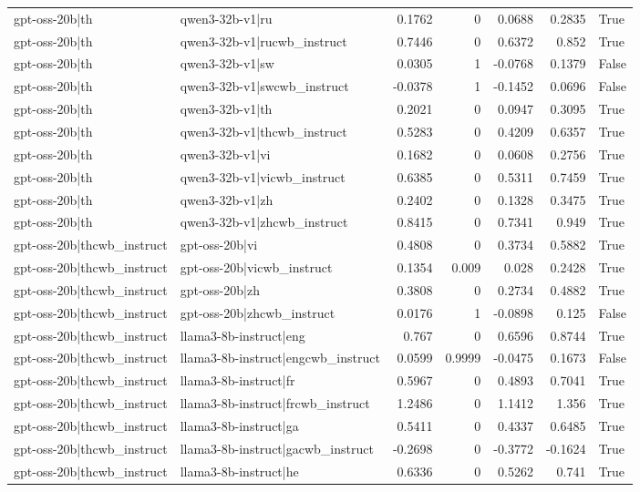 \begin{table}
\begin{tabular}{l l r r r r l}
gpt-oss-20b|th & qwen3-32b-v1|ru & 0.1762 & 0 & 0.0688 & 0.2835 & True \\
gpt-oss-20b|th & qwen3-32b-v1|rucwb_instruct & 0.7446 & 0 & 0.6372 & 0.852 & True \\
gpt-oss-20b|th & qwen3-32b-v1|sw & 0.0305 & 1 & -0.0768 & 0.1379 & False \\
gpt-oss-20b|th & qwen3-32b-v1|swcwb_instruct & -0.0378 & 1 & -0.1452 & 0.0696 & False \\
gpt-oss-20b|th & qwen3-32b-v1|th & 0.2021 & 0 & 0.0947 & 0.3095 & True \\
gpt-oss-20b|th & qwen3-32b-v1|thcwb_instruct & 0.5283 & 0 & 0.4209 & 0.6357 & True \\
gpt-oss-20b|th & qwen3-32b-v1|vi & 0.1682 & 0 & 0.0608 & 0.2756 & True \\
gpt-oss-20b|th & qwen3-32b-v1|vicwb_instruct & 0.6385 & 0 & 0.5311 & 0.7459 & True \\
gpt-oss-20b|th & qwen3-32b-v1|zh & 0.2402 & 0 & 0.1328 & 0.3475 & True \\
gpt-oss-20b|th & qwen3-32b-v1|zhcwb_instruct & 0.8415 & 0 & 0.7341 & 0.949 & True \\
gpt-oss-20b|thcwb_instruct & gpt-oss-20b|vi & 0.4808 & 0 & 0.3734 & 0.5882 & True \\
gpt-oss-20b|thcwb_instruct & gpt-oss-20b|vicwb_instruct & 0.1354 & 0.009 & 0.028 & 0.2428 & True \\
gpt-oss-20b|thcwb_instruct & gpt-oss-20b|zh & 0.3808 & 0 & 0.2734 & 0.4882 & True \\
gpt-oss-20b|thcwb_instruct & gpt-oss-20b|zhcwb_instruct & 0.0176 & 1 & -0.0898 & 0.125 & False \\
gpt-oss-20b|thcwb_instruct & llama3-8b-instruct|eng & 0.767 & 0 & 0.6596 & 0.8744 & True \\
gpt-oss-20b|thcwb_instruct & llama3-8b-instruct|engcwb_instruct & 0.0599 & 0.9999 & -0.0475 & 0.1673 & False \\
gpt-oss-20b|thcwb_instruct & llama3-8b-instruct|fr & 0.5967 & 0 & 0.4893 & 0.7041 & True \\
gpt-oss-20b|thcwb_instruct & llama3-8b-instruct|frcwb_instruct & 1.2486 & 0 & 1.1412 & 1.356 & True \\
gpt-oss-20b|thcwb_instruct & llama3-8b-instruct|ga & 0.5411 & 0 & 0.4337 & 0.6485 & True \\
gpt-oss-20b|thcwb_instruct & llama3-8b-instruct|gacwb_instruct & -0.2698 & 0 & -0.3772 & -0.1624 & True \\
gpt-oss-20b|thcwb_instruct & llama3-8b-instruct|he & 0.6336 & 0 & 0.5262 & 0.741 & True \\

\end{tabular}
\end{table}
